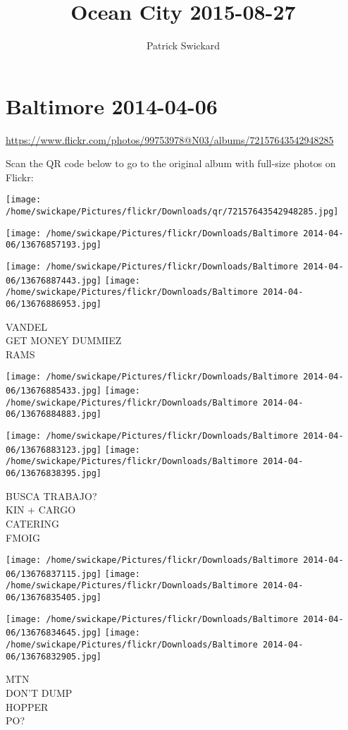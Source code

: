 \documentclass[10pt,letterpaper]{article}
\title{Ocean City 2015-08-27}
\author{Patrick Swickard}
\date{}
\begin{document}
\section*{Baltimore 2014-04-06}

\url{https://www.flickr.com/photos/99753978@N03/albums/72157643542948285}

Scan the QR code below to go to the original album with full-size photos on Flickr:

\texttt{[image: /home/swickape/Pictures/flickr/Downloads/qr/72157643542948285.jpg]}
\pagebreak

\texttt{[image: /home/swickape/Pictures/flickr/Downloads/Baltimore 2014-04-06/13676857193.jpg]}

\vspace{0.25in}
\texttt{[image: /home/swickape/Pictures/flickr/Downloads/Baltimore 2014-04-06/13676887443.jpg]}
\texttt{[image: /home/swickape/Pictures/flickr/Downloads/Baltimore 2014-04-06/13676886953.jpg]}

VANDEL\\
GET MONEY DUMMIEZ\\
RAMS
\pagebreak

\texttt{[image: /home/swickape/Pictures/flickr/Downloads/Baltimore 2014-04-06/13676885433.jpg]}
\texttt{[image: /home/swickape/Pictures/flickr/Downloads/Baltimore 2014-04-06/13676884883.jpg]}

\texttt{[image: /home/swickape/Pictures/flickr/Downloads/Baltimore 2014-04-06/13676883123.jpg]}
\texttt{[image: /home/swickape/Pictures/flickr/Downloads/Baltimore 2014-04-06/13676838395.jpg]}

BUSCA TRABAJO?\\
KIN + CARGO\\
CATERING\\
FMOIG
\pagebreak

\texttt{[image: /home/swickape/Pictures/flickr/Downloads/Baltimore 2014-04-06/13676837115.jpg]}
\texttt{[image: /home/swickape/Pictures/flickr/Downloads/Baltimore 2014-04-06/13676835405.jpg]}

\texttt{[image: /home/swickape/Pictures/flickr/Downloads/Baltimore 2014-04-06/13676834645.jpg]}
\texttt{[image: /home/swickape/Pictures/flickr/Downloads/Baltimore 2014-04-06/13676832905.jpg]}

MTN\\
DON'T DUMP\\
HOPPER\\
PO?
\pagebreak
\end{document}
